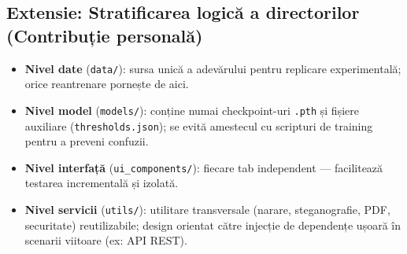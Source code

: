 \subsection*{Extensie: Stratificarea logică a directorilor (Contribuție personală)}
\begin{itemize}
  \item \textbf{Nivel date} (\texttt{data/}): sursa unică a adevărului pentru replicare experimentală; orice reantrenare pornește de aici. 
  \item \textbf{Nivel model} (\texttt{models/}): conține numai checkpoint-uri \texttt{.pth} și fișiere auxiliare (\texttt{thresholds.json}); se evită amestecul cu scripturi de training pentru a preveni confuzii.
  \item \textbf{Nivel interfață} (\texttt{ui\_components/}): fiecare tab independent — facilitează testarea incrementală și izolată.
  \item \textbf{Nivel servicii} (\texttt{utils/}): utilitare transversale (narare, steganografie, PDF, securitate) reutilizabile; design orientat către injecție de dependențe ușoară în scenarii viitoare (ex: API REST).
\end{itemize}


